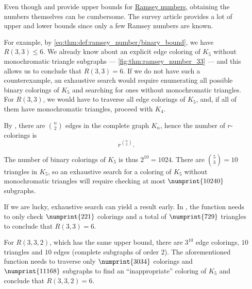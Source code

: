 \begin{remark}\label{rem:estimating_ramsey_numbers}
  Even though  and  provide upper bounds for \hyperref[def:ramsey_number]{Ramsey numbers}, obtaining the numbers themselves can be cumbersome. The survey article \cite{Radziszowski2021RamseyNumbers} provides a lot of upper and lower bounds since only a few Ramsey numbers are known.

  For example, by \eqref{eq:thm:def:ramsey_number/binary_bound}, we have \( R(3, 3) \leq 6 \). We already know about an explicit edge coloring of \( K_5 \) without monochromatic triangle subgraphs --- \cref{fig:thm:ramsey_number_33} --- and this allows us to conclude that \( R(3, 3) = 6 \). If we do not have such a counterexample, an exhaustive search would require enumerating all possible binary colorings of \( K_5 \) and searching for ones without monochromatic triangles. For \( R(3, 3) \), we would have to traverse all edge colorings of \( K_5 \), and, if all of them have monochromatic triangles, proceed with \( K_4 \).

  By , there are \( \binom n 2 \) edges in the complete graph \( K_n \), hence the number of \( r \)-colorings is
  \begin{equation*}
    r^{\binom n 2}.
  \end{equation*}

  The number of binary colorings of \( K_5 \) is thus \( 2^{10} = 1024 \). There are \( \binom 5 3 = 10 \) triangles in \( K_5 \), so an exhaustive search for a coloring of \( K_5 \) without monochromatic triangles will require checking at most \( \numprint{10 240} \) subgraphs.

  If we are lucky, exhaustive search can yield a result early. In \cite{notebook:code}, the function  needs to only check \( \numprint{221} \) colorings and a total of \( \numprint{729} \) triangles to conclude that \( R(3, 3) = 6 \).

  For \( R(3, 3, 2) \), which has the same upper bound, there are \( 3^{10} \) edge colorings, \( 10 \) triangles and \( 10 \) edges (complete subgraphs of order \( 2 \)). The aforementioned function needs to traverse only \( \numprint{3034} \) colorings and \( \numprint{11 168} \) subgraphs to find an \enquote{inappropriate} coloring of \( K_5 \) and conclude that \( R(3, 3, 2) = 6 \).


\end{remark}
